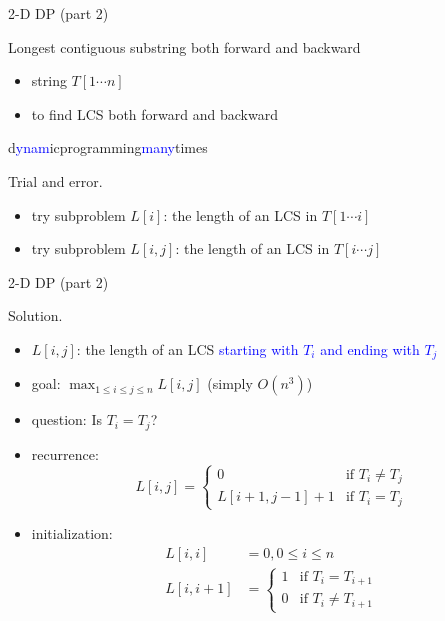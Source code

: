 \begin{frame}{2-D DP (part 2)}
  \begin{exampleblock}{Longest contiguous substring both forward and backward }
    \begin{itemize}
      \item string $T[1 \cdots n]$
      \item to find LCS both forward and backward
    \end{itemize}

    \begin{center}
      d\textcolor{blue}{ynam}icprogramming\textcolor{blue}{many}times
    \end{center}
  \end{exampleblock}

  \begin{alertblock}{Trial and error.}
    \begin{itemize}
      \item try subproblem $L[i]$: the length of an LCS in $T[1 \cdots i]$
      \item try subproblem $L[i,j]$: the length of an LCS in $T[i \cdots j]$
    \end{itemize}
  \end{alertblock}
\end{frame}
\begin{frame}{2-D DP (part 2)}
  \begin{block}{Solution.}
    \begin{itemize}
      \item $L[i,j]$: the length of an LCS \textcolor{blue}{starting with $T_{i}$ and ending with $T_{j}$}
      \item goal: $\max_{1 \le i \le j \le n} L[i,j]$ (simply $O(n^3)$)
      \item<2-> question: Is $T_{i} = T_{j}$?
      \item<2-> recurrence: 
	\begin{displaymath}
	  L[i,j] = \left\{ \begin{array}{ll}
	    0 & \textrm{if $T_{i} \neq T_{j}$}  \\
	    L[i+1,j-1] + 1 & \textrm{if $T_{i} = T_{j}$}
	  \end{array} \right.
	\end{displaymath}
      \item<3-> initialization: 
	\begin{align*}
	  L[i,i] &= 0, 0 \le i \le n  \\
	  L[i,i+1] &= \left\{ \begin{array}{ll}
	    1 & \text{if } T_{i} = T_{i+1}  \\
	    0 & \text{if } T_{i} \neq T_{i+1}
	    \end{array} \right.
	\end{align*}
    \end{itemize}
  \end{block}
\end{frame}
